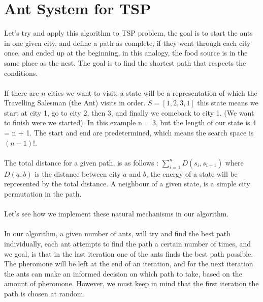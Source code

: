 \documentclass[a4paper]{article}
\begin{document}
\section{Ant System for TSP}
Let's try and apply this algorithm to TSP problem, the goal is to start the ants in one given city, and define a path as complete, if they went through each city once, and ended up at the beginning, in this analogy, the food source is in the same place as the nest. The goal is to find the shortest path that respects the conditions.\\\\ If there are $n$ cities we want to visit, a state will be a representation of which the Travelling Salesman (the Ant) visits in order. $S = [1,2,3,1]$ this state means we start at city 1, go to city 2, then 3, and finally we comeback to city 1. (We want to finish were we started). In this example n = 3, but the length of our state is 4 = n + 1. The start and end are predetermined, which means the search space is $(n-1)!$.\\\\ The total distance for a given path, is as follows : $\sum_{i = 1}^{n} D(s_{i}, s_{i+1})$ where $D(a,b)$ is the distance between city $a$ and $b$, the energy of a state will be represented by the total distance. A neighbour of a given state, is a simple city permutation in the path.\\\\
Let's see how we implement these natural mechanisms in our algorithm.\\\\
In our algorithm, a given number of ants, will try and find the best path individually, each ant attempts to find the path a certain number of times, and we goal, is that in the last iteration one of the ants finds the best path possible. The pheromone will be left at the end of an iteration, and for the next iteration the ants can make an informed decision on which path to take, based on the amount of pheromone. However, we must keep in mind that the first iteration the path is chosen at random.\\\\
\end{document}
